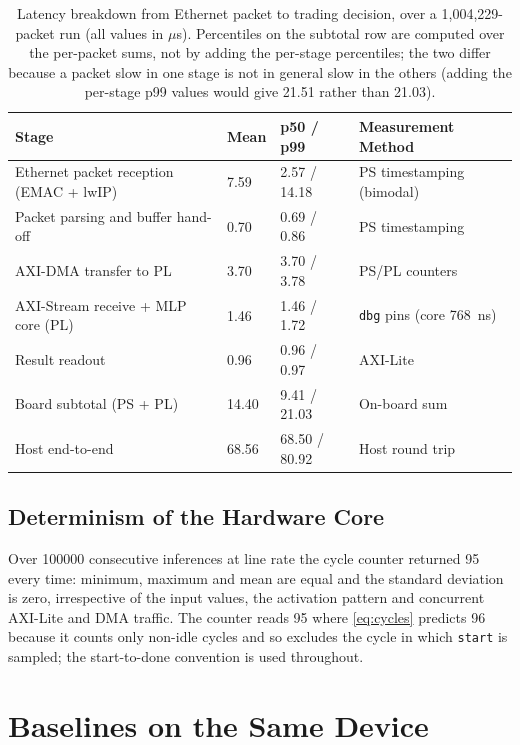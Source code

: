 \documentclass[final,5p,times,twocolumn]{elsarticle}
\begin{document}
\begin{table}[t]
\centering
\caption{Latency breakdown from Ethernet packet to trading decision, over a
1{,}004{,}229-packet run (all values in $\mu$s). Percentiles on the subtotal row
are computed over the per-packet sums, not by adding the per-stage percentiles;
the two differ because a packet slow in one stage is not in general slow in the
others (adding the per-stage p99 values would give 21.51 rather than 21.03).}
\label{tab:latency_breakdown}
\begin{tabular}{p{4.6cm} p{1.5cm} p{2.4cm} p{4.4cm}}
\toprule
Stage & Mean & p50 / p99 & Measurement Method \\
\midrule
Ethernet packet reception (EMAC + lwIP) & 7.59 & 2.57 / 14.18 & PS timestamping (bimodal) \\
Packet parsing and buffer hand-off & 0.70 & 0.69 / 0.86 & PS timestamping \\
AXI-DMA transfer to PL & 3.70 & 3.70 / 3.78 & PS/PL counters \\
AXI-Stream receive + MLP core (PL) & 1.46 & 1.46 / 1.72 & \texttt{dbg} pins (core \SI{768}{\nano\second}) \\
Result readout & 0.96 & 0.96 / 0.97 & AXI-Lite \\
\midrule
Board subtotal (PS + PL) & 14.40 & 9.41 / 21.03 & On-board sum \\
Host end-to-end & 68.56 & 68.50 / 80.92 & Host round trip \\
\bottomrule
\end{tabular}
\end{table}

\subsection{Determinism of the Hardware Core}
\label{sec:determinism}
Over \num{100000} consecutive inferences at line rate the cycle counter returned
95 every time: minimum, maximum and mean are equal and the standard deviation is
zero, irrespective of the input values, the activation pattern and concurrent
AXI-Lite and DMA traffic. The counter reads 95 where \eqref{eq:cycles} predicts
96 because it counts only non-idle cycles and so excludes the cycle in which
\texttt{start} is sampled; the start-to-done convention is used throughout.

\section{Baselines on the Same Device}
\label{sec:baselines}
\end{document}
